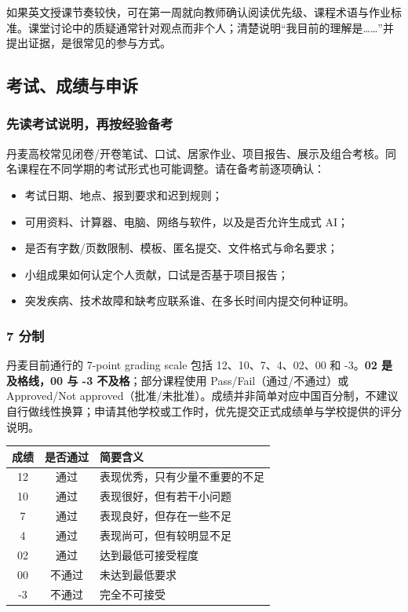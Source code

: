 如果英文授课节奏较快，可在第一周就向教师确认阅读优先级、课程术语与作业标准。课堂讨论中的质疑通常针对观点而非个人；清楚说明“我目前的理解是……”并提出证据，是很常见的参与方式。

\subsection{考试、成绩与申诉}

\subsubsection*{先读考试说明，再按经验备考}

丹麦高校常见闭卷/开卷笔试、口试、居家作业、项目报告、展示及组合考核。同名课程在不同学期的考试形式也可能调整。请在备考前逐项确认：

\begin{itemize}
  \item 考试日期、地点、报到要求和迟到规则；
  \item 可用资料、计算器、电脑、网络与软件，以及是否允许生成式 AI；
  \item 是否有字数/页数限制、模板、匿名提交、文件格式与命名要求；
  \item 小组成果如何认定个人贡献，口试是否基于项目报告；
  \item 突发疾病、技术故障和缺考应联系谁、在多长时间内提交何种证明。
\end{itemize}

\subsubsection*{7 分制}

丹麦目前通行的 7-point grading scale 包括 12、10、7、4、02、00 和 -3。\textbf{02 是及格线，00 与 -3 不及格}；部分课程使用 Pass/Fail（通过/不通过）或 Approved/Not approved（批准/未批准）。成绩并非简单对应中国百分制，不建议自行做线性换算；申请其他学校或工作时，优先提交正式成绩单与学校提供的评分说明。

\begin{center}
\begin{tabular}{ccl}
\toprule
成绩 & 是否通过 & 简要含义 \\
\midrule
12 & 通过 & 表现优秀，只有少量不重要的不足 \\
10 & 通过 & 表现很好，但有若干小问题 \\
7  & 通过 & 表现良好，但存在一些不足 \\
4  & 通过 & 表现尚可，但有较明显不足 \\
02 & 通过 & 达到最低可接受程度 \\
00 & 不通过 & 未达到最低要求 \\
-3 & 不通过 & 完全不可接受 \\
\bottomrule
\end{tabular}
\end{center}


